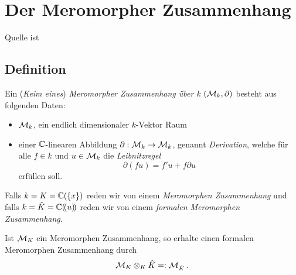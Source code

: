 
\chapter{Der Meromorpher Zusammenhang}
Quelle ist \cite{sabbah_cimpa90}
\section{Definition}

\begin{defn}
  Ein (\emph{Keim eines}) \emph{Meromorpher Zusammenhang über $k$}
  $(\mathcal{M}_k,\partial)$ besteht aus folgenden Daten:
  \begin{itemize}
    \item $\mathcal{M}_k$, ein endlich dimensionaler $k$-Vektor Raum
    \item einer $\mathbb{C}$-linearen Abbildung $\partial:\mathcal{M}_k\rightarrow \mathcal{M}_k$,
      genannt \emph{Derivation}, welche für alle $f\in k$ und $u\in \mathcal{M}_k$ die
      \emph{Leibnitzregel}
      \begin{equation}\label{eq:Leibnitzregel}
        \partial(fu)=f'u+f\partial u
      \end{equation}
      erfüllen soll.
  \end{itemize}
  Falls $k=K=\mathbb{C}(\{x\})$ reden wir von einem \emph{Meromorphen Zusammenhang}
  und falls $k=\hat K={\mathbb C (\!(u)\!)}$ reden wir von einem \emph{formalen Meromorphen
  Zusammenhang}.
\end{defn}
\begin{bem}
  Ist $\mathcal{M}_K$ ein Meromorphen Zusammenhang, so erhalte einen formalen
  Meromorphen Zusammenhang durch
  \[ \mathcal{M}_K\otimes_{K}\hat K =: \mathcal{M}_{\hat K} \,. \]
\end{bem}

